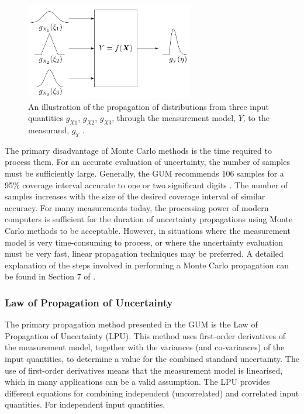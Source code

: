 \documentclass[../thesis/thesis.tex]{subfiles}
\begin{document}
\begin{refsection}
\begin{figure}
	\centering
	\includegraphics[width=0.65\textwidth]{distributions}
	\caption{An illustration of the propagation of distributions from three input quantities $g_{X1}$, $g_{X2}$, $g_{X3}$, through the measurement model, $Y$, to the measurand, $g_{Y}$ \cite{GUM_S1}.}
	\label{ch3_fig_distributions}
\end{figure}

The primary disadvantage of Monte Carlo methods is the time required to process them. For an accurate evaluation of uncertainty, the number of samples must be sufficiently large. Generally, the GUM recommends 106 samples for a 95\% coverage interval accurate to one or two significant digits \cite[7.2.1]{GUM_S1}. The number of samples increases with the size of the desired coverage interval of similar accuracy. For many measurements today, the processing power of modern computers is sufficient for the duration of uncertainty propagations using Monte Carlo methods to be acceptable. However, in situations where the measurement model is very time-consuming to process, or where the uncertainty evaluation must be very fast, linear propagation techniques may be preferred. A detailed explanation of the steps involved in performing a Monte Carlo propagation can be found in Section 7 of \cite{GUM_S1}.

\subsubsection{Law of Propagation of Uncertainty}

The primary propagation method presented in the GUM is the Law of Propagation of Uncertainty (LPU). This method uses first-order derivatives of the measurement model, together with the variances (and co-variances) of the input quantities, to determine a value for the combined standard uncertainty. The use of first-order derivatives means that the measurement model is linearised, which in many applications can be a valid assumption. The LPU provides different equations for combining independent (uncorrelated) and correlated input quantities. For independent input quantities,


\end{refsection}
\end{document}
